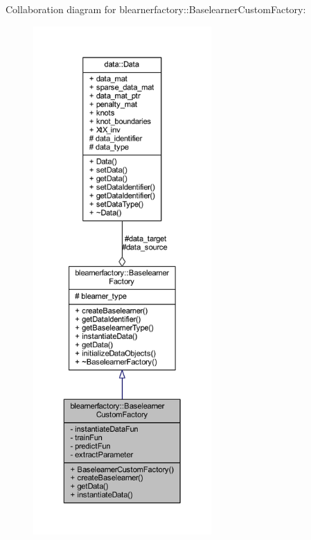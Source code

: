 Collaboration diagram for blearnerfactory\+:\+:Baselearner\+Custom\+Factory\+:
\nopagebreak
\begin{figure}[H]
\begin{center}
\leavevmode
\includegraphics[height=550pt]{classblearnerfactory_1_1_baselearner_custom_factory__coll__graph}
\end{center}
\end{figure}
